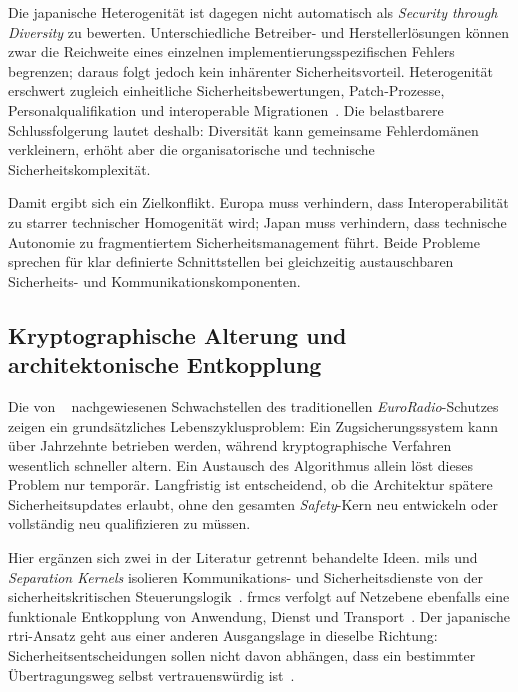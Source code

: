 \documentclass[runningheads]{res/llncs}
\begin{document}
Die japanische Heterogenität ist dagegen nicht automatisch als \textit{Security through Diversity} zu bewerten. Unterschiedliche Betreiber- und Herstellerlösungen können zwar die Reichweite eines einzelnen implementierungsspezifischen Fehlers begrenzen; daraus folgt jedoch kein inhärenter Sicherheitsvorteil. Heterogenität erschwert zugleich einheitliche Sicherheitsbewertungen, Patch-Prozesse, Personalqualifikation und interoperable Migrationen~\parencite{yanaseJapanese2011}. Die belastbarere Schlussfolgerung lautet deshalb: Diversität kann gemeinsame Fehlerdomänen verkleinern, erhöht aber die organisatorische und technische Sicherheitskomplexität.

Damit ergibt sich ein Zielkonflikt. Europa muss verhindern, dass Interoperabilität zu starrer technischer Homogenität wird; Japan muss verhindern, dass technische Autonomie zu fragmentiertem Sicherheitsmanagement führt. Beide Probleme sprechen für klar definierte Schnittstellen bei gleichzeitig austauschbaren Sicherheits- und Kommunikationskomponenten.

\subsection{Kryptographische Alterung und architektonische Entkopplung}
\label{sec:Kryptographische_Schwachstellen_und_MILS-basierte_Architekturkapselung}
Die von ~\cite{chothiaAttack2017} nachgewiesenen Schwachstellen des traditionellen \textit{EuroRadio}-Schutzes zeigen ein grundsätzliches Lebenszyklusproblem: Ein Zugsicherungssystem kann über Jahrzehnte betrieben werden, während kryptographische Verfahren wesentlich schneller altern. Ein Austausch des Algorithmus allein löst dieses Problem nur temporär. Langfristig ist entscheidend, ob die Architektur spätere Sicherheitsupdates erlaubt, ohne den gesamten \textit{Safety}-Kern neu entwickeln oder vollständig neu qualifizieren zu müssen.

Hier ergänzen sich zwei in der Literatur getrennt behandelte Ideen. \gls{mils} und \textit{Separation Kernels} isolieren Kommunikations- und Sicherheitsdienste von der sicherheitskritischen Steuerungslogik~\cite{schulzIntegration2019}. \gls{frmcs} verfolgt auf Netzebene ebenfalls eine funktionale Entkopplung von Anwendung, Dienst und Transport~\parencite[S. 125--152]{trinckaufETCS2024}. Der japanische \gls{rtri}-Ansatz geht aus einer anderen Ausgangslage in dieselbe Richtung: Sicherheitsentscheidungen sollen nicht davon abhängen, dass ein bestimmter Übertragungsweg selbst vertrauenswürdig ist~\parencite[S. 1--4]{iwamotoTrain2024}.
\end{document}
